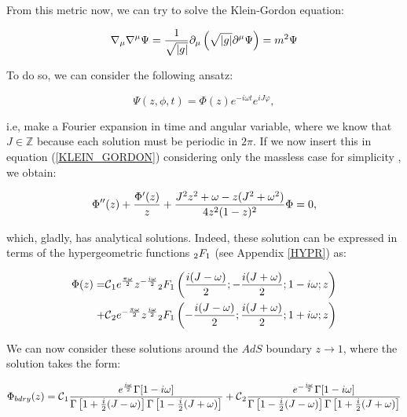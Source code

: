 \documentclass[11pt,a4paper]{article}
\begin{document}
From this metric now, we can try to solve the Klein-Gordon equation:

\begin{equation}\LA{KLEIN_GORDON}
    \nabla_\mu\nabla^\mu \Psi =\frac{1}{\sqrt{\abs{g}}}\del_\mu\left(\sqrt{\abs{g}}\del^\mu\Psi\right)= m^2\Psi
\end{equation}

{\noindent To do so, we can consider the following ansatz: }

\begin{equation}
    \Psi(z,\phi,t) = \Phi(z)e^{-i\omega t}e^{iJ\varphi},
\end{equation}

{\noindent i.e, make a Fourier expansion in time and angular variable, where we know that $J\in\mathds{Z}$ because each solution must be periodic in $2\pi$. If we now insert this in equation (\ref{KLEIN_GORDON}) considering only the massless case for simplicity \cite{Jeong_2025,Das_2023,das2023fuzzballsrandommatrices}, we obtain:}

\begin{equation}
    \Phi''(z) + \frac{\Phi'(z)}{z} + \frac{J^2z^2+\omega-z(J^2+\omega^2)}{4z^2(1-z)^2}\Phi=0,
\end{equation}

which, gladly, has analytical solutions. Indeed, these solution can be expressed in terms of the hypergeometric functions ${}_2F_1$ (see Appendix \ref{HYPR}) as:

\begin{equation}\LA{SOL_BTZ}
    \begin{aligned}
        \Phi(z) = & \calc_1 e^{\frac{\pi\w}{2}} z^{-\frac{i\w}{2}}\hypr\left(\frac{i(J-\w)}{2};-\frac{i(J+\w)}{2};1-i\w;z\right) \\
    + & \calc_2 e^{-\frac{\pi\w}{2}} z^{\frac{i\w}{2}}\hypr\left(-\frac{i(J-\w)}{2};\frac{i(J+\w)}{2};1+i\w;z\right)
\end{aligned}
\end{equation}

We can now consider these solutions around the $AdS$ boundary $z\rightarrow 1$, where the solution takes the form:

\begin{equation}
    \Phi_{bdry}(z) = \mbox{${\cal C}$}_1\frac{e^{\frac{i\omega}{2}}\Gamma[1-i\omega]}{\Gamma\left[1+\frac{i}{2}(J-\omega)\right]\Gamma\left[1-\frac{i}{2}(J+\omega)\right]} + \mbox{${\cal C}$}_2\frac{e^{-\frac{i\omega}{2}}\Gamma[1-i\omega]}{\Gamma\left[1-\frac{i}{2}(J-\omega)\right]\Gamma\left[1+\frac{i}{2}(J+\omega)\right]}
\end{equation}
\end{document}
